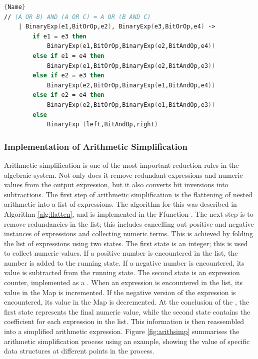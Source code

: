 \begin{lstlisting}[caption=Case in pattern match which implements the reduction rule for Boolean Simplification Rule 9,frame=tlrb, language=FSharp, label=lst:boolsimp]{Name}
// (A OR B) AND (A OR C) = A OR (B AND C)
    | BinaryExp(e1,BitOrOp,e2), BinaryExp(e3,BitOrOp,e4) ->
        if e1 = e3 then
            BinaryExp(e1,BitOrOp,BinaryExp(e2,BitAndOp,e4))
        else if e1 = e4 then
            BinaryExp(e1,BitOrOp,BinaryExp(e2,BitAndOp,e3))
        else if e2 = e3 then
            BinaryExp(e2,BitOrOp,BinaryExp(e1,BitAndOp,e4))
        else if e2 = e4 then
            BinaryExp(e2,BitOrOp,BinaryExp(e1,BitAndOp,e3))
        else
            BinaryExp (left,BitAndOp,right)
\end{lstlisting}

\subsubsection{Implementation of Arithmetic Simplification}
Arithmetic simplification is one of the most important reduction rules in the algebraic system. Not only does it remove redundant expressions and numeric values from the output expression, but it also converts bit inversions into subtractions. The first step of arithmetic simplification is the flattening of nested arithmetic into a list of expressions. The algorithm for this was described in Algorithm \ref{alg:flatten}, and is implemented in the F\fsharp function . The next step is to remove redundancies in the list; this includes cancelling out positive and negative instances of expressions and collecting numeric terms. This is achieved by folding the list of expressions using two states. The first state is an integer; this is used to collect numeric values. If a positive number is encountered in the list, the number is added to the running state. If a negative number is encountered, its value is subtracted from the running state. The second state is an expression counter, implemented as a . When an expression is encountered in the list, its value in the Map is incremented. If the negative version of the expression is encountered, its value in the Map is decremented. At the conclusion of the , the first state represents the final numeric value, while the second state contains the coefficient for each expression in the list. This information is then reassembled into a simplified arithmetic expression. Figure \ref{fig:arithsimp} summarises the arithmetic simplification process using an example, showing the value of specific data structures at different points in the process.

